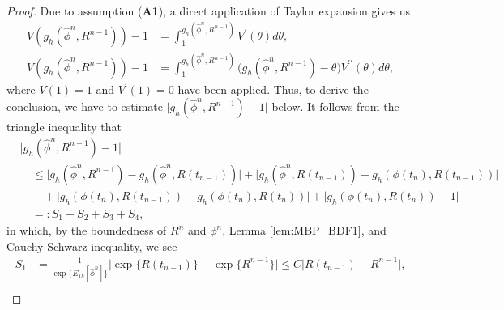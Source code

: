 \documentclass{m2an}
\begin{document}
\begin{proof} Due to assumption (\textbf{A1}), a direct application of Taylor expansion gives us
	\begin{equation*}
		\begin{aligned}
			V( g_h( \hat{\phi}^n, R^{n-1} ) ) -1 & = \int_{1}^{ g_h( \hat{\phi}^n, R^{n-1} ) } V^{\prime} ( \theta ) d\theta, \\  
			V( g_h( \hat{\phi}^n, R^{n-1} ) )-1 & = \int_{1}^{ g_h( \hat{\phi}^n, R^{n-1} ) } \big(  g_h( \hat{\phi}^n, R^{n-1} )-\theta \big) V^{\prime\prime}  ( \theta ) d\theta,
		\end{aligned}
	\end{equation*}
	where $ V(1) = 1 $ and $ V^{\prime}(1) = 0 $ have been applied.  Thus, to derive the conclusion, we have to estimate $\big\vert g_h( \hat{\phi}^n, R^{n-1} ) - 1 \big\vert$ below.
	It follows from the triangle inequality that
	\begin{equation}\label{estig_1}
		\begin{aligned}
			&  \big\vert g_h( \hat{\phi}^n, R^{n-1} ) - 1 \big\vert \\
			& \quad \leq \big\vert g_h( \hat{\phi}^n, R^{n-1} ) - g_h( \hat{\phi}^n, R( t_{n-1} ) ) \big\vert 
			+ \big\vert g_h( \hat{\phi}^n, R( t_{n-1} ) ) - g_h( \phi( t_{n} ), R( t_{n-1} ) ) \big\vert \\
			& \quad \quad + \big\vert  g_h( \phi( t_{n} ), R( t_{n-1} ) )  - g_h( \phi( t_{n} ), R( t_{n} ) ) \big\vert + \big\vert g_h( \phi( t_{n} ), R( t_{n} ) ) - 1 \big\vert \\ 
			& \quad =: S_{1}+S_{2}+S_{3} + S_{4},
		\end{aligned}
	\end{equation}
	in which, by the boundedness of $ R^{n} $ and $ \phi^{n} $, Lemma \ref{lem:MBP_BDF1}, and Cauchy-Schwarz inequality, we see
	\begin{equation*}
		\begin{aligned}
			S_{1} & = \frac{ 1 }{ \exp \{E_{1 h}[ \hat{\phi}^{n} ] \} } \big\vert \exp \{ R( t_{n-1} ) \} - \exp \{ R^{n-1} \}  \big\vert  \leq C\vert R( t_{n-1} ) - R^{n-1} \vert,
		\end{aligned}
	\end{equation*}
	\begin{equation*}
		\begin{aligned}

\end{aligned}
\end{equation*}
\end{proof}
\end{document}
